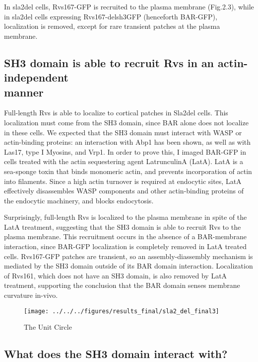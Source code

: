 	\vspace{5mm}
	In sla2del cells, Rvs167-GFP is recruited to the plasma membrane (Fig.2.3), while in sla2del cells expressing Rvs167-delsh3GFP (henceforth BAR-GFP), localization is removed, except for rare transient patches at the plasma membrane. 

	\subsection{SH3 domain is able to recruit Rvs in an
	actin-independent  	\\ manner}
	Full-length Rvs is able to localize to cortical patches in Sla2del cells. This localization must come from the SH3 domain, since BAR alone 	does not localize in these cells. We expected that the SH3 domain must interact with WASP or actin-binding proteins: an interaction with Abp1 has been shown, as well as with Las17, type I Myosins, and Vrp1. In order to prove this, I imaged BAR-GFP in cells treated with the actin sequestering agent LatrunculinA (LatA). LatA is a sea-sponge toxin that binds monomeric actin, and prevents incorporation of actin into filaments. Since a high actin turnover is required at endocytic sites, LatA effectively disassembles WASP components and other actin-binding proteins of the endocytic machinery, and blocks endocytosis. 

	\vspace{5mm}
	Surprisingly, full-length Rvs is localized to the plasma membrane in spite of the LatA treatment, suggesting that the SH3 domain is able to recruit Rvs to the plasma membrane. This recruitment occurs in the absence of a BAR-membrane interaction, since BAR-GFP localization is completely removed in LatA treated cells. Rvs167-GFP patches are transient, so an assembly-diassembly mechanism is mediated by the SH3 domain outside of its BAR domain interaction. Localization of Rvs161, which does not have an SH3 domain, is also removed by LatA treatment, supporting the conclusion that the BAR domain senses membrane curvature in-vivo. 

\begin{figure}
	\centering
\texttt{[image: ../../../figures/results\_final/sla2\_del\_final3]}
	\caption{The Unit Circle \label{fig1}}
\end{figure}

	\subsection{What does the SH3 domain interact with?}
